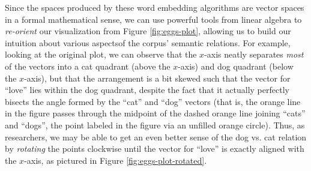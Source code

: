\documentclass[11pt]{article}
\begin{document}
Since the spaces produced by these word embedding algorithms are vector spaces in a formal mathematical sense, we can use powerful tools from linear algebra to \textit{re-orient} our visualization from Figure \ref{fig:eggs-plot}, allowing us to build our intuition about various aspectsof the corpus' semantic relations. For example, looking at the original plot, we can observe that the $x$-axis neatly separates \textit{most} of the vectors into a cat quadrant (above the $x$-axis) and dog quadrant (below the $x$-axis), but that the arrangement is a bit skewed such that the vector for ``love'' lies within the dog quadrant, despite the fact that it actually perfectly bisects the angle formed by the ``cat'' and ``dog'' vectors (that is, the orange line in the figure passes through the midpoint of the dashed orange line joining ``cats'' and ``dogs'', the point labeled in the figure via an unfilled orange circle). Thus, as researchers, we may be able to get an even better sense of the dog vs. cat relation by \textit{rotating} the points clockwise until the vector for ``love'' is exactly aligned with the $x$-axis, as pictured in Figure \ref{fig:eggs-plot-rotated}.

\end{document}
